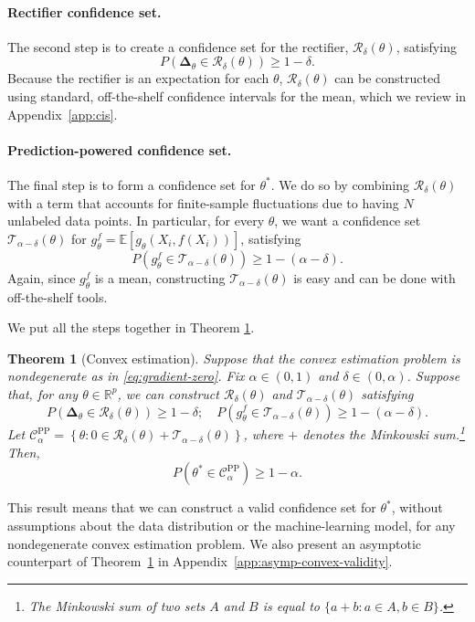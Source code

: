 \documentclass[10pt]{article}
\newtheorem{theorem}{Theorem}
\def\R{\mathbb{R}}
\def\E{\mathbb{E}}
\newcommand{\T}{\mathcal{T}}
\newcommand{\cR}{\mathcal{R}}
\newcommand{\rec}{\mathbf{\Delta}}
\newcommand{\CPP}{\mathcal{C}^{\mathrm{PP}}}
\begin{document}
\paragraph{Rectifier confidence set.} The second step is to create a confidence set for the rectifier, $\cR_{\delta}(\theta)$, satisfying 
\begin{equation}
\label{eq:convex-rec-set}
    P\left(\rec_{\theta} \in \cR_{\delta}(\theta) \right) \geq 1-\delta.
\end{equation}
Because the rectifier is an expectation for each $\theta$, $\cR_{\delta}(\theta)$ can be constructed using standard, off-the-shelf confidence intervals for the mean, which we review in Appendix~\ref{app:cis}.

\paragraph{Prediction-powered confidence set.} The final step is to form a confidence set for $\theta^*$.
We do so by combining $\cR_\delta(\theta)$ with a term that accounts for finite-sample fluctuations due to having $N$ unlabeled data points. In particular, for every $\theta$, we want a confidence set $\T_{\alpha-\delta}(\theta)$ for $g_{\theta}^f = \E [g_\theta (X_i,f(X_i)) ]$, satisfying
$$P\left(g_{\theta}^f \in \T_{\alpha-\delta}(\theta) \right)\geq 1 - (\alpha-\delta).$$
Again, since $g_{\theta}^f$ is a mean, constructing $\T_{\alpha-\delta}(\theta)$ is easy and can be done with off-the-shelf tools.

We put all the steps together in Theorem \ref{thm:convex-validity}.

\begin{theorem}[Convex estimation]
\label{thm:convex-validity}
Suppose that the convex estimation problem is nondegenerate as in \eqref{eq:gradient-zero}. Fix $\alpha\in(0,1)$ and $\delta\in(0,\alpha)$.
Suppose that, for any $\theta\in\R^p$, we can construct $\cR_\delta(\theta)$ and $\T_{\alpha-\delta}(\theta)$ satisfying
$$P\left(\rec_{\theta} \in \cR_{\delta}(\theta) \right) \geq 1-\delta; \quad P\left(g_{\theta}^f \in \T_{\alpha-\delta}(\theta) \right) \geq 1-(\alpha-\delta).$$
Let $\CPP_\alpha = \left\{\theta : 0 \in \cR_\delta(\theta) + \T_{\alpha-\delta}(\theta)\right\}$, where $+$ denotes the Minkowski sum.\footnote{The Minkowski sum of two sets $A$ and $B$ is equal to $\{a+b: a\in A, b\in B\}$.} Then,
\begin{equation}
    P( \theta^* \in \CPP_\alpha ) \geq 1-\alpha.
\end{equation}
\end{theorem}
This result means that we can construct a valid confidence set for $\theta^*$, without assumptions about the data distribution or the machine-learning model, for any nondegenerate convex estimation problem.
We also present an asymptotic counterpart of Theorem~\ref{thm:convex-validity} in Appendix~\ref{app:asymp-convex-validity}.
\end{document}

